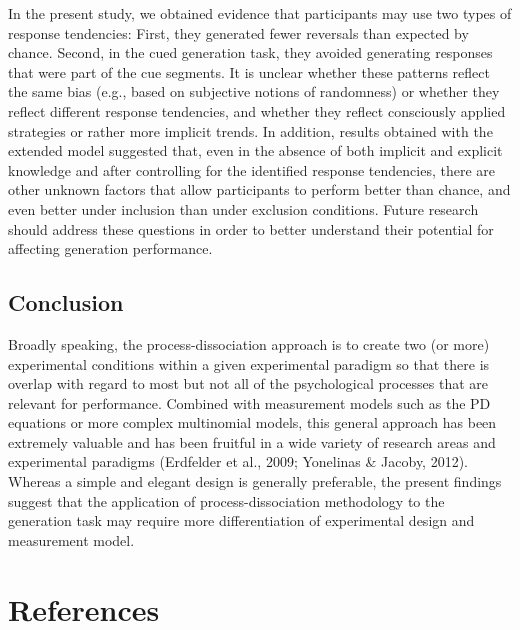 \documentclass[
  english,
  man]{apa6}
\begin{document}
In the present study, we obtained evidence that participants may use two types of response tendencies:
First, they generated fewer reversals than expected by chance.
Second, in the cued generation task, they avoided generating responses that were part of the cue segments.
It is unclear whether these patterns reflect the same bias (e.g., based on subjective notions of randomness) or whether they reflect different response tendencies, and whether they reflect consciously applied strategies or rather more implicit trends.
In addition, results obtained with the extended model suggested that, even in the absence of both implicit and explicit knowledge and after controlling for the identified response tendencies, there are other unknown factors that allow participants to perform better than chance, and even better under inclusion than under exclusion conditions.
Future research should address these questions in order to better understand their potential for affecting generation performance.

\hypertarget{conclusion}{%
\subsection{Conclusion}\label{conclusion}}

Broadly speaking, the process-dissociation approach is to create two (or more) experimental conditions within a given experimental paradigm so that there is overlap with regard to most but not all of the psychological processes that are relevant for performance.
Combined with measurement models such as the PD equations or more complex multinomial models, this general approach has been extremely valuable and has been fruitful in a wide variety of research areas and experimental paradigms (Erdfelder et al., 2009; Yonelinas \& Jacoby, 2012).
Whereas a simple and elegant design is generally preferable, the present findings suggest that the application of process-dissociation methodology to the generation task may require more differentiation of experimental design and measurement model.

\newpage

\hypertarget{references}{%
\section{References}\label{references}}

\begingroup
\setlength{\parindent}{-0.5in}
\setlength{\leftskip}{0.5in}
\end{document}
